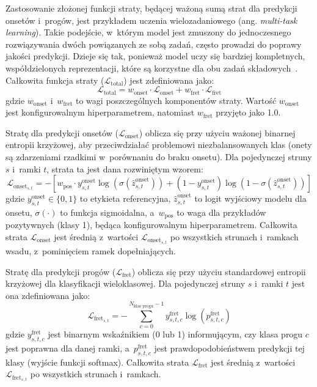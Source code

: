 Zastosowanie złożonej funkcji straty, będącej ważoną sumą strat dla predykcji onsetów i~progów, jest przykładem uczenia wielozadaniowego (ang. \textit{multi-task learning}). Takie podejście, w~którym model jest zmuszony do jednoczesnego rozwiązywania dwóch powiązanych ze sobą zadań, często prowadzi do poprawy jakości predykcji. Dzieje się tak, ponieważ model uczy się bardziej kompletnych, współdzielonych reprezentacji, które są korzystne dla obu zadań składowych~\autocite{Hawthorne2018Onsets}. Całkowita funkcja straty ($\mathcal{L}_{\text{total}}$) jest zdefiniowana jako:
\begin{equation}
    \mathcal{L}_{\text{total}} = w_{\text{onset}} \cdot \mathcal{L}_{\text{onset}} + w_{\text{fret}} \cdot \mathcal{L}_{\text{fret}}
    \label{eq:combined_loss}
\end{equation}
gdzie $w_{\text{onset}}$ i~$w_{\text{fret}}$ to wagi poszczególnych komponentów straty. Wartość $w_{\text{onset}}$ jest konfigurowalnym hiperparametrem, natomiast $w_{\text{fret}}$ przyjęto jako 1.0.

Stratę dla predykcji onsetów ($\mathcal{L}_{\text{onset}}$) oblicza się przy użyciu ważonej binarnej entropii krzyżowej, aby przeciwdziałać problemowi niezbalansowanych klas (onety są zdarzeniami rzadkimi w~porównaniu do braku onsetu). Dla pojedynczej struny $s$ i~ramki $t$, strata ta jest dana rozwiniętym wzorem:
\begin{equation}
    \mathcal{L}_{\text{onset}_{s,t}} = - [w_{\text{pos}} \cdot y_{s,t}^{\text{onset}} \log(\sigma(\hat{z}_{s,t}^{\text{onset}})) + (1-y_{s,t}^{\text{onset}})\log(1-\sigma(\hat{z}_{s,t}^{\text{onset}}))]
    \label{eq:onset_loss_formula}
\end{equation}
gdzie $y_{s,t}^{\text{onset}} \in \{0,1\}$ to etykieta referencyjna, $\hat{z}_{s,t}^{\text{onset}}$ to logit wyjściowy modelu dla onsetu, $\sigma(\cdot)$ to funkcja sigmoidalna, a~$w_{\text{pos}}$ to waga dla przykładów pozytywnych (klasy 1), będąca konfigurowalnym hiperparametrem. Całkowita strata $\mathcal{L}_{\text{onset}}$ jest średnią z~wartości $\mathcal{L}_{\text{onset}_{s,t}}$ po wszystkich strunach i~ramkach wsadu, z~pominięciem ramek dopełniających.

Stratę dla predykcji progów ($\mathcal{L}_{\text{fret}}$) oblicza się przy użyciu standardowej entropii krzyżowej dla klasyfikacji wieloklasowej. Dla pojedynczej struny $s$ i~ramki $t$ jest ona zdefiniowana jako:
\begin{equation}
    \mathcal{L}_{\text{fret}_{s,t}} = - \sum_{c=0}^{N_{\text{klas progu}}-1} y_{s,t,c}^{\text{fret}} \log(p_{s,t,c}^{\text{fret}})
    \label{eq:fret_loss_formula}
\end{equation}
gdzie $y_{s,t,c}^{\text{fret}}$ jest binarnym wskaźnikiem (0 lub 1) informującym, czy klasa progu $c$ jest poprawna dla danej ramki, a~$p_{s,t,c}^{\text{fret}}$ jest prawdopodobieństwem predykcji tej klasy (wyjście funkcji softmax). Całkowita strata $\mathcal{L}_{\text{fret}}$ jest średnią z~wartości $\mathcal{L}_{\text{fret}_{s,t}}$ po wszystkich strunach i~ramkach.

